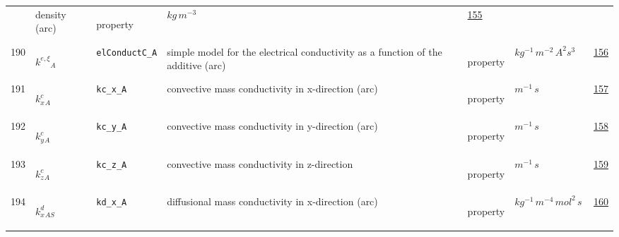 \begin{longtable}{|p{1cm}|p{2.5cm}|p{4.5cm}|p{8cm}|p{3.0cm}|p{3cm}|p{1cm}|}
             & density (arc)
             & \begin{lay}property \end{lay}
             & $ kg \,m^{-3} \, $
             &                 \hyperlink{"e:155"}{ 155 }
                 \\
            190
             & \hypertarget{"v:190"}{ $ {{k^{e,\xi}}}{_{A}} $}
             & \verb|elConductC_A|
             & simple model for the electrical conductivity as a function of the additive (arc)
             & \begin{lay}property \end{lay}
             & $ kg^{-1} \,m^{-2} \,A^{2} s^{3} \, $
             &                 \hyperlink{"e:156"}{ 156 }
                 \\
            191
             & \hypertarget{"v:191"}{ $ {{k^c_x}}{_{A}} $}
             & \verb|kc_x_A|
             & convective mass conductivity in x-direction (arc)
             & \begin{lay}property \end{lay}
             & $ m^{-1} \,s \, $
             &                 \hyperlink{"e:157"}{ 157 }
                 \\
            192
             & \hypertarget{"v:192"}{ $ {{k^c_y}}{_{A}} $}
             & \verb|kc_y_A|
             & convective mass conductivity in y-direction (arc)
             & \begin{lay}property \end{lay}
             & $ m^{-1} \,s \, $
             &                 \hyperlink{"e:158"}{ 158 }
                 \\
            193
             & \hypertarget{"v:193"}{ $ {{k^c_z}}{_{A}} $}
             & \verb|kc_z_A|
             & convective mass conductivity in z-direction
             & \begin{lay}property \end{lay}
             & $ m^{-1} \,s \, $
             &                 \hyperlink{"e:159"}{ 159 }
                 \\
            194
             & \hypertarget{"v:194"}{ $ {{k^d_x}}{_{{A S}}} $}
             & \verb|kd_x_A|
             & diffusional mass conductivity in x-direction (arc)
             & \begin{lay}property \end{lay}
             & $ kg^{-1} \,m^{-4} \,mol^{2} \,s \, $
             &                 \hyperlink{"e:160"}{ 160 }
                 \\

\end{longtable}
